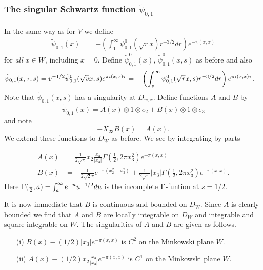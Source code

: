 \subsubsection{The singular Schwartz function $\tilde{\psi}_{0,1}$}




In the same way as for $V$ we define
\begin{align}\label{Greeneq}
\tilde{\psi}_{0,1}(x)  &= - \left(\int_1^{\infty} \psi_{0,1}^0(\sqrt{r}x) r^{-3/2} dr\right)e^{-\pi(x,x)}
\end{align}
for {\it all} $x \in W$, including $x=0$. Define $\tilde{\psi}_{0,1}^0(x)$, $\tilde{\psi}_{0,1}^0(x,s)$ as before and also
\begin{align}\label{xiZ}
\tilde{\psi}_{0,1}(x,\tau,s) &= v^{-1/2} \tilde{\psi}_{0,1}^0(\sqrt{v}x,s) e^{\pi i (x,x)\tau}  = - \left( \int_v^{\infty} \psi_{0,1}^0(\sqrt{r}x,s) r^{-3/2} dr \right) e^{\pi i (x,x)\tau} \notag.
\end{align}
Note that $\tilde{\psi}_{0,1}(x,s)$ has a singularity at $D_{w,x}$. Define functions $A$ and $B$ by
\[
\tilde{\psi}_{0,1}(x)  = A(x)  \otimes 1 \otimes e_2  + B(x) \otimes 1 \otimes e_3
\]
and note 
\begin{equation}\label{AB-eq}
-X_{23} B(x) = A(x).
\end{equation}
We extend these functions to $D_W$ as before. We see by integrating by parts



\begin{lemma}\label{firstformulaforAandB}
\begin{align*}
A(x) &= 
\frac{1}{2\sqrt{\pi}}  x_2 \frac{x_3}{|x_3|}  \Gamma(\tfrac12,2 \pi x_3^2)  e^{-\pi (x,x)}    \label{AA}\\
B(x)& =
 - \frac{1}{2 \sqrt{2} \pi} e^{- \pi(x_2^2+ x_3^2)} + \frac{1}{2  \sqrt{\pi}}|x_3|    \Gamma(\tfrac12,2 \pi x_3^2)  e^{-\pi (x,x)}.
\end{align*}
Here $\Gamma(\tfrac12,a) = \int_a^{\infty} e^{-u} u^{-1/2} du$ is the incomplete $\Gamma$-funtion at $s=1/2$. 
\end{lemma}

 
$\text{It is now immediate that $B$ is continuous and bounded on $D_W$.}$ Since $A$ is clearly bounded
we find that $A$ and $B$ are locally integrable on $D_W$ and integrable and square-integrable on $W$. The singularities of $A$ and $B$ are given as follows.

\begin{lemma}\label{singularitiesofAandB}
\begin{enumerate}
\item[(i)] $B(x) - (1/2)|x_3| e^{-\pi (x,x)} $ is $C^2$ on the Minkowski plane $W$.
\item[(ii)] $A(x)- (1/2) x_2 \frac{x_3}{|x_3|} e^{-\pi (x,x)}$ is $C^1$ on the Minkowski plane $W$.
\end{enumerate}
\end{lemma}

